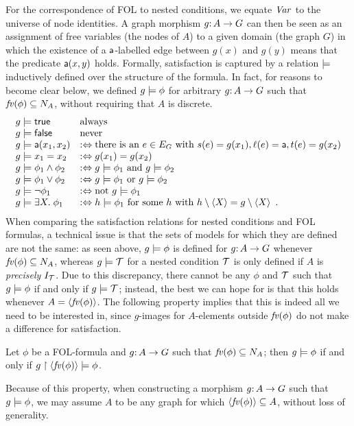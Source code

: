 For the correspondence of FOL to nested conditions, we equate $\mathit{Var}$ to the universe of node identities. A graph morphism $g{:}\, A\rightarrow G$ can then be seen as an assignment of free variables (the nodes of $A$) to a given domain (the graph $G$) in which the existence of a $\mathsf{a}$-labelled edge between $g(x)$ and $g(y)$ means that the predicate $\mathsf{a}(x,y)$ holds. Formally, satisfaction is captured by a relation $\models$ inductively defined over the structure of the formula. In fact, for reasons to become clear below, we defined $g\models \phi$ for arbitrary $g{:}\, A\rightarrow G$ such that $\mathit{fv}(\phi)\subseteq N_A$, without requiring that $A$ is discrete.
%
\[\begin{array}{ll}
g\models \mathsf{true} & \text{always} \\
g\models \mathsf{false} & \text{never} \\
g\models \mathsf{a}(x_1,x_2) & :\Leftrightarrow \text{there is an } e\in E_G \text{ with } s(e)=g(x_1), \ell(e)=\mathsf{a}, t(e)=g(x_2) \\
g\models x_1=x_2 & :\Leftrightarrow g(x_1)=g(x_2) \\
g\models \phi_1\wedge \phi_2 & :\Leftrightarrow g\models \phi_1 \text{ and } g\models \phi_2 \\
g\models \phi_1\vee \phi_2 & :\Leftrightarrow g\models \phi_1 \text{ or } g\models \phi_2 \\
g\models \neg\phi_1 & :\Leftrightarrow \text{not } g\models \phi_1 \\
g\models \exists X.\; \phi_1  & :\Leftrightarrow h\models \phi_1 \text{ for some } h \text{ with } h\setminus \langle X\rangle =g\setminus \langle X\rangle \enspace.
\end{array}\]
%
When comparing the satisfaction relations for nested conditions and FOL formulas, a technical issue is that the sets of models for which they are defined are not the same: as seen above, $g\models\phi$ is defined for $g{:}\, A\rightarrow G$ whenever $\mathit{fv}(\phi)\subseteq N_A$, whereas $g\models{\mathcal{T}}$ for a nested condition ${\mathcal{T}}$ is only defined if $A$ is \emph{precisely} $I_{\mathcal{T}}$. Due to this discrepancy, there cannot be any $\phi$ and ${\mathcal{T}}$ such that $g\models \phi$ if and only if $g\models {\mathcal{T}}$; instead, the best we can hope for is that this holds whenever $A=\langle \mathit{fv}(\phi)\rangle$. The following property implies that this is indeed all we need to be interested in, since $g$-images for $A$-elements outside $\mathit{fv}(\phi)$ do not make a difference for satisfaction.

\begin{proposition}\label{prop:free vars only}
Let $\phi$ be a FOL-formula and $g{:}\, A\rightarrow G$ such that $\mathit{fv}(\phi)\subseteq N_A$; then $g\models \phi$ if and only if $g\restriction \langle \mathit{fv}(\phi)\rangle\models \phi$.
\end{proposition}
%
Because of this property, when constructing a morphism $g{:}\, A\rightarrow G$ such that $g\models \phi$, we may assume $A$ to be any graph for which $\langle \mathit{fv}(\phi)\rangle\subseteq A$, without loss of generality.

